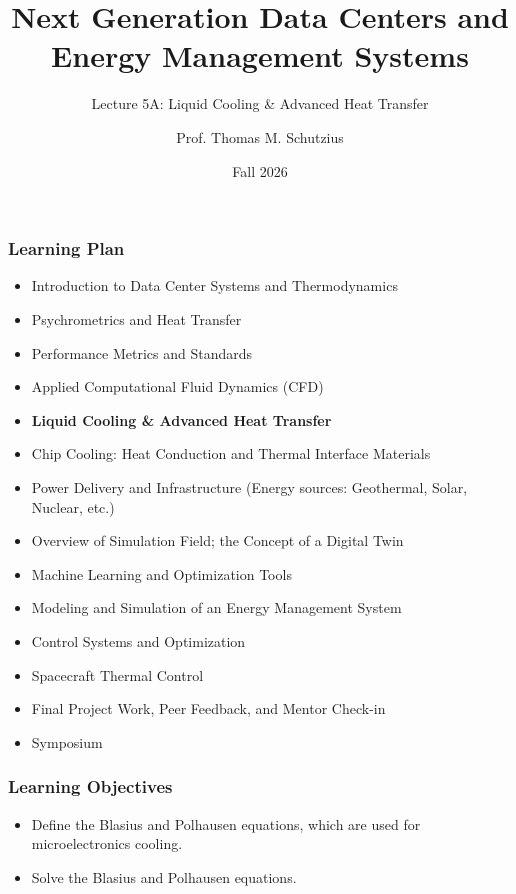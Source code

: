 \documentclass[aspectratio=169,10pt,xcolor={table,dvipsnames},t]{beamer}
\title[lecture 05]{Next Generation Data Centers and Energy Management Systems}
\subtitle{Lecture 5A: Liquid Cooling \& Advanced Heat Transfer}
\author{Prof. Thomas M. Schutzius}
\institute{Department of Mechanical Engineering}
\date{Fall 2026}
\begin{document}
\begin{frame}
  \titlepage
\end{frame}


{
\smallframetitle
	\begin{frame}
		\frametitle{Learning Plan}
		\begin{itemize}
			\item Introduction to Data Center Systems and Thermodynamics 
			\item Psychrometrics and Heat Transfer
			\item Performance Metrics and Standards
			\item Applied Computational Fluid Dynamics (CFD)
			\item \textbf{Liquid Cooling \& Advanced Heat Transfer}
			\item Chip Cooling: Heat Conduction and Thermal Interface Materials 
			\item Power Delivery and Infrastructure (Energy sources: Geothermal, Solar, Nuclear, etc.)
			\item Overview of Simulation Field; the Concept of a Digital Twin 
			\item Machine Learning and Optimization Tools 
			\item Modeling and Simulation of an Energy Management System 
			\item Control Systems and Optimization 
			\item Spacecraft Thermal Control
			\item Final Project Work, Peer Feedback, and Mentor Check-in 
			\item Symposium 
		\end{itemize}		
	\end{frame}
}

{
\smallframetitle
	\begin{frame}
		\frametitle{Learning Objectives}
		\begin{itemize}
			\item Define the Blasius and Polhausen equations, which are used for microelectronics cooling.
			\item Solve the Blasius and Polhausen equations.
		\end{itemize}		
	\end{frame}
}
\end{document}
